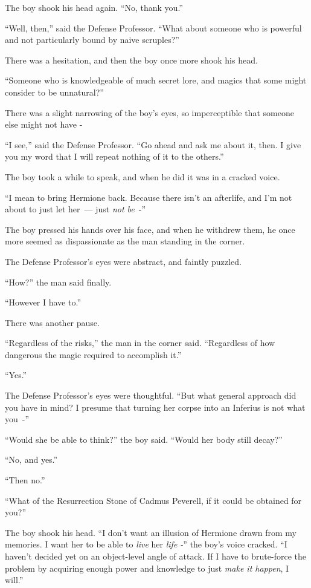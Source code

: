 The boy shook his head again. ``No, thank you.''

``Well, then,'' said the Defense Professor. ``What about someone who is powerful and not particularly bound by naive scruples?''

There was a hesitation, and then the boy once more shook his head.

``Someone who is knowledgeable of much secret lore, and magics that some might consider to be unnatural?''

There was a slight narrowing of the boy's eyes, so imperceptible that someone else might not have -

``I see,'' said the Defense Professor. ``Go ahead and ask me about it, then. I give you my word that I will repeat nothing of it to the others.''

The boy took a while to speak, and when he did it was in a cracked voice.

``I mean to bring Hermione back. Because there isn't an afterlife, and I'm not about to just let her~--- just \emph{not be}~-''

The boy pressed his hands over his face, and when he withdrew them, he once more seemed as dispassionate as the man standing in the corner.

The Defense Professor's eyes were abstract, and faintly puzzled.

``How?'' the man said finally.

``However I have to.''

There was another pause.

``Regardless of the risks,'' the man in the corner said. ``Regardless of how dangerous the magic required to accomplish it.''

``Yes.''

The Defense Professor's eyes were thoughtful. ``But what general approach did you have in mind? I presume that turning her corpse into an Inferius is not what you~-''

``Would she be able to think?'' the boy said. ``Would her body still decay?''

``No, and yes.''

``Then no.''

``What of the Resurrection Stone of Cadmus Peverell, if it could be obtained for you?''

The boy shook his head. ``I don't want an illusion of Hermione drawn from my memories. I want her to be able to \emph{live} her \emph{life -}'' the boy's voice cracked. ``I haven't decided yet on an object-level angle of attack. If I have to brute-force the problem by acquiring enough power and knowledge to just \emph{make it happen}, I will.''

